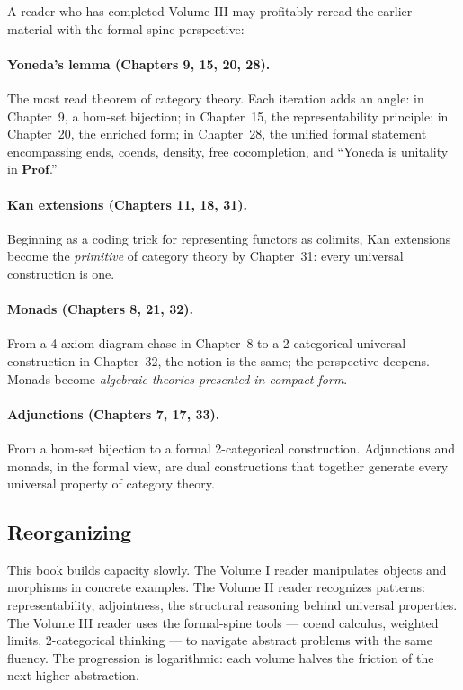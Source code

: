 A reader who has completed Volume III may profitably reread the earlier
material with the formal-spine perspective:

\paragraph{Yoneda's lemma (Chapters 9, 15, 20, 28).} The most read theorem
of category theory. Each iteration adds an angle: in Chapter~9, a hom-set
bijection; in Chapter~15, the representability principle; in Chapter~20,
the enriched form; in Chapter~28, the unified formal statement encompassing
ends, coends, density, free cocompletion, and ``Yoneda is unitality in
$\mathbf{Prof}$.''

\paragraph{Kan extensions (Chapters 11, 18, 31).} Beginning as a coding
trick for representing functors as colimits, Kan extensions become the
\emph{primitive} of category theory by Chapter~31: every universal
construction is one.

\paragraph{Monads (Chapters 8, 21, 32).} From a 4-axiom diagram-chase
in Chapter~8 to a 2-categorical universal construction in Chapter~32, the
notion is the same; the perspective deepens. Monads become
\emph{algebraic theories presented in compact form}.

\paragraph{Adjunctions (Chapters 7, 17, 33).} From a hom-set bijection to
a formal 2-categorical construction. Adjunctions and monads, in the formal
view, are dual constructions that together generate every universal
property of category theory.

\subsection{Reorganizing}

\begin{remark}
This book builds capacity slowly. The Volume I reader manipulates objects
and morphisms in concrete examples. The Volume II reader recognizes
patterns: representability, adjointness, the structural reasoning behind
universal properties. The Volume III reader uses the formal-spine tools —
coend calculus, weighted limits, 2-categorical thinking — to navigate
abstract problems with the same fluency. The progression is logarithmic:
each volume halves the friction of the next-higher abstraction.
\end{remark}


